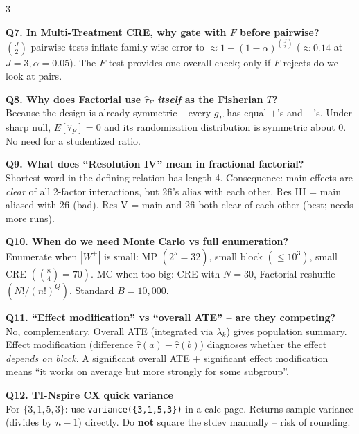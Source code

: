 \documentclass[10pt,landscape]{article}
\begin{document}
\begin{multicols*}{3}
\begin{qbox}
\textbf{Q7. In Multi-Treatment CRE, why gate with $F$ before pairwise?}\\
$\binom{J}{2}$ pairwise tests inflate family-wise error to $\approx 1-(1-\alpha)^{\binom{J}{2}}$ ($\approx 0.14$ at $J=3,\alpha=0.05$). The $F$-test provides one overall check; only if $F$ rejects do we look at pairs.
\end{qbox}

\begin{qbox}
\textbf{Q8. Why does Factorial use $\hat\tau_F$ \emph{itself} as the Fisherian $T$?}\\
Because the design is already symmetric -- every $g_F$ has equal $+$'s and $-$'s. Under sharp null, $E[\hat\tau_F]=0$ and its randomization distribution is symmetric about 0. No need for a studentized ratio.
\end{qbox}

\begin{qbox}
\textbf{Q9. What does ``Resolution IV'' mean in fractional factorial?}\\
Shortest word in the defining relation has length 4. Consequence: main effects are \emph{clear} of all 2-factor interactions, but 2fi's alias with each other. Res III = main aliased with 2fi (bad). Res V = main and 2fi both clear of each other (best; needs more runs).
\end{qbox}

\begin{qbox}
\textbf{Q10. When do we need Monte Carlo vs full enumeration?}\\
Enumerate when $|W^+|$ is small: MP $(2^5=32)$, small block $(\le 10^3)$, small CRE $(\binom{8}{4}=70)$. MC when too big: CRE with $N=30$, Factorial reshuffle $(N!/(n!)^Q)$. Standard $B=10{,}000$.
\end{qbox}

\begin{qbox}
\textbf{Q11. ``Effect modification'' vs ``overall ATE'' -- are they competing?}\\
No, complementary. Overall ATE (integrated via $\lambda_k$) gives population summary. Effect modification (difference $\hat\tau(a)-\hat\tau(b)$) diagnoses whether the effect \emph{depends on block}. A significant overall ATE + significant effect modification means ``it works on average but more strongly for some subgroup''.
\end{qbox}

\begin{qbox}
\textbf{Q12. TI-Nspire CX quick variance}\\
For $\{3,1,5,3\}$: use \texttt{variance(\{3,1,5,3\})} in a calc page. Returns sample variance (divides by $n-1$) directly. Do \textbf{not} square the stdev manually -- risk of rounding.
\end{qbox}


\end{multicols*}
\end{document}
